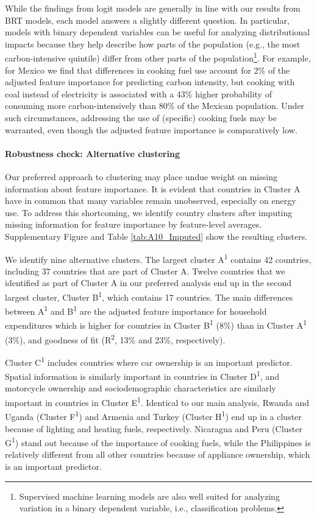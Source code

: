 \documentclass[12pt, a4paper]{article}
\begin{document}
While the findings from logit models are generally in line with our results from BRT models, each model answers a slightly different question. In particular, models with binary dependent variables can be useful for analyzing distributional impacts because they help describe how parts of the population (e.g., the most carbon-intensive quintile) differ from other parts of the population\footnote{Supervised machine learning models are also well suited for analyzing variation in a binary dependent variable, i.e., classification problems.}. For example, for Mexico we find that differences in cooking fuel use account for 2\% of the adjusted feature importance for predicting carbon intensity, but cooking with coal instead of electricity is associated with a 43\% higher probability of consuming more carbon-intensively than 80\% of the Mexican population. Under such circumstances, addressing the use of (specific) cooking fuels may be warranted, even though the adjusted feature importance is comparatively low.

\paragraph{Robustness check: Alternative clustering}

Our preferred approach to clustering may place undue weight on missing information about feature importance. It is evident that countries in Cluster A have in common that many variables remain unobserved, especially on energy use. To address this shortcoming, we identify country clusters after imputing missing information for feature importance by feature-level averages. Supplementary Figure  and Table \ref{tab:A10_Imputed} show the resulting clusters.

We identify nine alternative clusters. The largest cluster A\textsuperscript{1} contains 42 countries, including 37 countries that are part of Cluster A. Twelve countries that we identified as part of Cluster A in our preferred analysis end up in the second largest cluster, Cluster B\textsuperscript{1}, which contains 17 countries. The main differences between A\textsuperscript{1} and B\textsuperscript{1} are the adjusted feature importance for household expenditures which is higher for countries in Cluster B\textsuperscript{1} (8\%) than in Cluster A\textsuperscript{1} (3\%), and goodness of fit (R\textsuperscript{2}, 13\% and 23\%, respectively).

Cluster C\textsuperscript{1} includes countries where car ownership is an important predictor. Spatial information is similarly important in countries in Cluster D\textsuperscript{1}, and motorcycle ownership and sociodemographic characteristics are similarly important in countries in Cluster E\textsuperscript{1}. Identical to our main analysis, Rwanda and Uganda (Cluster F\textsuperscript{1}) and Armenia and Turkey (Cluster H\textsuperscript{1}) end up in a cluster because of lighting and heating fuels, respectively. Nicaragua and Peru (Cluster G\textsuperscript{1}) stand out because of the importance of cooking fuels, while the Philippines is relatively different from all other countries because of appliance ownership, which is an important predictor.
\end{document}
